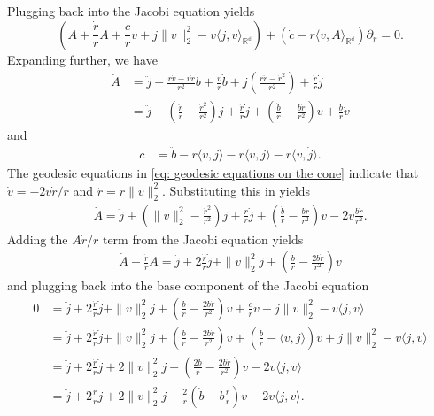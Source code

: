 \documentclass{article}
\begin{document}
Plugging back into the Jacobi equation yields
\begin{equation}
    \left(\dot A  + \frac{\dot r}{r}A + \frac{c}{r}v + j\|v\|_2^2 - v\langle j, v\rangle_{\mathbb{R^d}}\right) + \left(\dot c - r\langle v, A \rangle_{\mathbb{R^d}}\right)\partial_r = 0.
\end{equation}
Expanding further, we have
\begin{align}
    \dot A &= \ddot j + \frac{r\dot v - v \dot r}{r^2}b + \frac{v}{r}\dot b + j\left(\frac{r\ddot r - \dot r ^2}{r^2}\right) + \frac{\dot r}{r}\dot j\\
    &= \ddot j + \left(\frac{\ddot r}{r} - \frac{\dot r^2}{r^2}\right)j + \frac{\dot r}{r}\dot j + \left(\frac{\dot b}{r} - \frac{b \dot r}{r^2}\right)v + \frac{b}{r}\dot v
\end{align}
and 
\begin{align}
    \dot c &= \ddot b - \dot r \langle v, j\rangle - r\langle \dot v, j \rangle - r\langle v, \dot j\rangle.
\end{align}
The geodesic equations in \cref{eq: geodesic equations on the cone} indicate that $\dot v = -2v\dot r/r$ and $\ddot r = r\|v\|_2^2$. Substituting this in yields
\begin{align*}
    \dot A = \ddot j + \left(\|v\|_2^2 - \frac{\dot r^2}{r^2}\right)j + \frac{\dot r}{r}\dot j + \left(\frac{\dot b}{r} - \frac{b \dot r}{r^2}\right)v  -2v\frac{b\dot r}{r^2}.
\end{align*}
Adding the $A\dot r/r$ term from the Jacobi equation yields
\begin{align*}
    \dot A + \frac{\dot r}{r}A = \ddot j +  2\frac{\dot r}{r}\dot j +\|v\|_2^2j + \left(\frac{\dot b}{r} - \frac{2b \dot r}{r^2}\right)v
\end{align*}
and plugging back into the base component of the Jacobi equation
\begin{align}
    0 &= \ddot j +  2\frac{\dot r}{r}\dot j +\|v\|_2^2j + \left(\frac{\dot b}{r} - \frac{2b \dot r}{r^2}\right)v + \frac{c}{r}v + j\|v\|_2^2 - v\langle j, v\rangle \\
    &= \ddot j +  2\frac{\dot r}{r}\dot j +\|v\|_2^2j + \left(\frac{\dot b}{r} - \frac{2b \dot r}{r^2}\right)v + \left(\frac{\dot b}{r} - \langle v, j\rangle \right)v + j\|v\|_2^2 - v\langle j, v\rangle\\
    &= \ddot j +  2\frac{\dot r}{r}\dot j +2\|v\|_2^2j + \left(\frac{2\dot b}{r} - \frac{2b \dot r}{r^2}\right)v - 2v\langle j, v\rangle \\
    &= \ddot j +  2\frac{\dot r}{r}\dot j +2\|v\|_2^2j + \frac{2}{r}\left(\dot b - b\frac{ \dot r}{r}\right)v - 2v\langle j, v\rangle.
\end{align}
\end{document}
